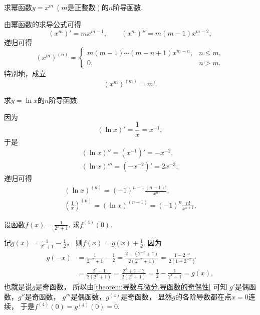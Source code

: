 \begin{example}
求幂函数\(y = x^m\ (\text{$m$是正整数})\)的\(n\)阶导函数.
\begin{solution}
由幂函数的求导公式可得\[
	(x^m)' = m x^{m-1},
	\qquad
	(x^m)'' = m(m-1) x^{m-2},
\]
递归可得\begin{equation}
	(x^m)^{(n)} = \left\{ \begin{array}{cl}
		m(m-1)\dotsm(m-n+1) x^{m-n}, & n \leq m, \\
		0, & n > m.
	\end{array} \right.
\end{equation}
特别地，成立\begin{equation}
	(x^m)^{(m)} = m!.
\end{equation}
\end{solution}
\end{example}

\begin{example}
求\(y = \ln x\)的\(n\)阶导函数.
\begin{solution}
因为\[
	(\ln x)' = \frac1x = x^{-1},
\]
于是\begin{gather*}
	(\ln x)'' = (x^{-1})' = -x^{-2}, \\
	(\ln x)''' = (-x^{-2})' = 2x^{-3},
\end{gather*}
递归可得\begin{gather}
	(\ln x)^{(n)}
	= (-1)^{n-1} \frac{(n-1)!}{x^n}, \\
	\left(\frac1x\right)^{(n)}
	= (\ln x)^{(n+1)}
	= (-1)^n \frac{n!}{x^{n+1}}.
\end{gather}
\end{solution}
\end{example}

\begin{example}
设函数\(f(x) = \frac1{2^x+1}\).
求\(f^{(4)}(0)\).
\begin{solution}
记\(g(x) = \frac1{2^x+1} - \frac12\)，
则\(f(x) = g(x) + \frac12\).
因为\begin{align*}
	g(-x) &= \frac1{2^{-x}+1} - \frac12
	= \frac{2-(2^{-x}+1)}{2(2^{-x}+1)}
	= \frac{1-2^{-x}}{2(1+2^{-x})} \\
	&= \frac{2^x-1}{2(2^x+1)}
	= \frac{2^x+1-2}{2(2^x+1)}
	= \frac12 - \frac1{2^x+1}
	= g(x),
\end{align*}
也就是说\(g\)是奇函数，
所以由\cref{theorem:导数与微分.导函数的奇偶性} 可知
\(g'\)是偶函数，\(g''\)是奇函数，
\(g'''\)是偶函数，\(g^{(4)}\)是奇函数，
显然\(g\)的各阶导数都在点\(x=0\)连续，
于是\(f^{(4)}(0) = g^{(4)}(0) = 0\).
\end{solution}
\end{example}

